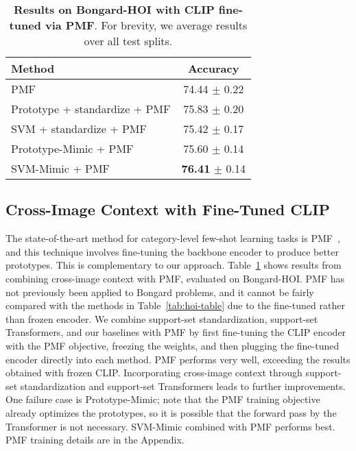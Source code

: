 \begin{table}
    \centering
      \begin{tabular}{lc}
      \toprule
      Method & Accuracy \\
      \midrule
      PMF~\cite{hu2022pushing} &  74.44 $\pm$ 0.22  \\
      Prototype + standardize + PMF &  75.83 $\pm$ 0.20  \\
      SVM + standardize + PMF & 75.42 $\pm$ 0.17 \\
      Prototype-Mimic + PMF &  75.60 $\pm$ 0.14 \\
      SVM-Mimic + PMF & \textbf{76.41} $\pm$ 0.14 \\
      \bottomrule
    \end{tabular}
        \caption{\textbf{Results on Bongard-HOI with CLIP fine-tuned via PMF}. For brevity, we average results over all test splits.}
    \label{tab:pmf}

\end{table}

\subsection{Cross-Image Context with Fine-Tuned CLIP}

The state-of-the-art method for category-level few-shot learning tasks is PMF~\cite{hu2022pushing}, and this technique involves fine-tuning the backbone encoder to produce better prototypes. This is complementary to our approach. Table~\ref{tab:pmf} shows results from combining cross-image context with PMF, evaluated on Bongard-HOI.
PMF has not previously been applied to Bongard problems, and it cannot be fairly compared with the methods in Table~\ref{tab:hoi-table} due to the fine-tuned rather than frozen encoder. We combine support-set standardization, support-set Transformers, and our baselines with PMF by first fine-tuning the CLIP encoder with the PMF objective, freezing the weights, and then plugging the fine-tuned encoder directly into each method. 
PMF performs very well, exceeding the 
 results obtained with frozen CLIP. 
Incorporating cross-image context through support-set standardization and support-set Transformers leads to further improvements.
One failure case is Prototype-Mimic; note that
the PMF training objective already optimizes the prototypes, so it is possible that the forward pass by the Transformer is not necessary. 
SVM-Mimic combined with PMF performs best. 
PMF training details are in the Appendix. 

